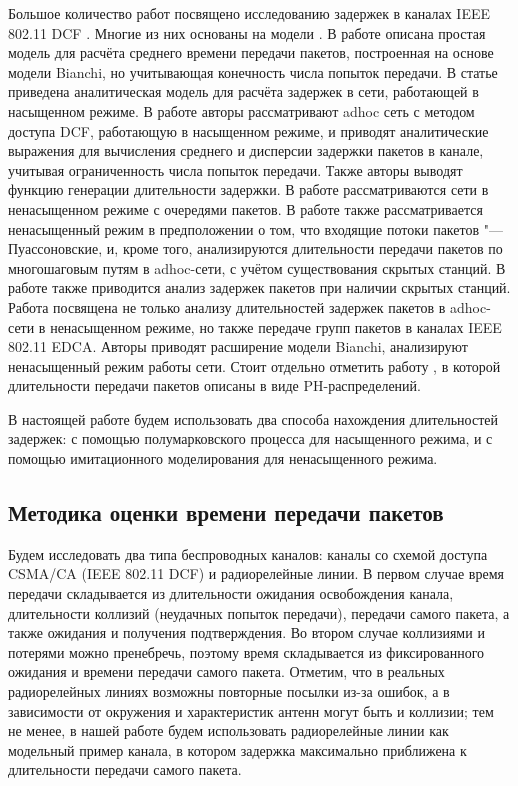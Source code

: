 Большое количество работ посвящено исследованию задержек в каналах IEEE 802.11 DCF \cite{Banchs2006,Chatzimisios2002,Dai2013,Dong2008,Felemban2011,Haghani2011,Hung2007,Issariyakul2005,Sakurai2007,Tickoo2008,Vardakas2007}. Многие из них основаны на модели \cite{Bianchi2000}. В работе \cite{Chatzimisios2002} описана простая модель для расчёта среднего времени передачи пакетов, построенная на основе модели Bianchi, но учитывающая конечность числа попыток передачи. В статье \cite{Banchs2006} приведена аналитическая модель для расчёта задержек в сети, работающей в насыщенном режиме. В работе \cite{Sakurai2007} авторы рассматривают adhoc сеть с методом доступа DCF, работающую в насыщенном режиме, и приводят аналитические выражения для вычисления среднего и дисперсии задержки пакетов в канале, учитывая ограниченность числа попыток передачи. Также авторы выводят функцию генерации длительности задержки. В работе \cite{Vardakas2007} рассматриваются сети в ненасыщенном режиме с очередями пакетов. В работе \cite{Dong2008} также рассматривается ненасыщенный режим в предположении о том, что входящие потоки пакетов "--- Пуассоновские, и, кроме того, анализируются длительности передачи пакетов по многошаговым путям в adhoc-сети, с учётом существования скрытых станций. В работе \cite{Hung2007} также приводится анализ задержек пакетов при наличии скрытых станций. Работа \cite{Tickoo2008} посвящена не только анализу длительностей задержек пакетов в adhoc-сети в ненасыщенном режиме, но также передаче групп пакетов в каналах IEEE 802.11 EDCA. Авторы \cite{Felemban2011} приводят расширение модели Bianchi, анализируют ненасыщенный режим работы сети. Стоит отдельно отметить работу \cite{Issariyakul2005}, в которой длительности передачи пакетов описаны в виде PH-распределений.

В настоящей работе будем использовать два способа нахождения длительностей задержек: с помощью полумарковского процесса для насыщенного режима, и с помощью имитационного моделирования для ненасыщенного режима.


\subsection{Методика оценки времени передачи пакетов}
Будем исследовать два типа беспроводных каналов: каналы со схемой доступа CSMA/CA (IEEE 802.11 DCF) и радиорелейные линии. В первом случае время передачи складывается из длительности ожидания освобождения канала, длительности коллизий (неудачных попыток передачи), передачи самого пакета, а также ожидания и получения подтверждения. Во втором случае коллизиями и потерями можно пренебречь, поэтому время складывается из фиксированного ожидания и времени передачи самого пакета. Отметим, что в реальных радиорелейных линиях возможны повторные посылки из-за ошибок, а в зависимости от окружения и характеристик антенн могут быть и коллизии; тем не менее, в нашей работе будем использовать радиорелейные линии как модельный пример канала, в котором задержка максимально приближена к длительности передачи самого пакета.


